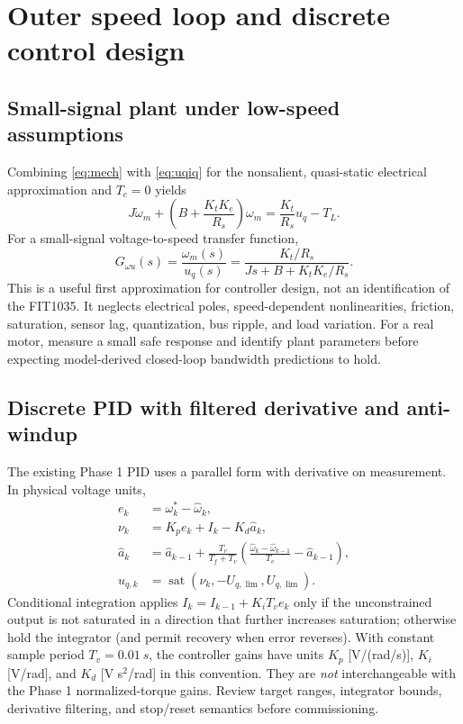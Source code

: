 \documentclass[10pt,letterpaper]{article}
\newcommand{\sat}{\operatorname{sat}}
\begin{document}
\section{Outer speed loop and discrete control design}
\subsection{Small-signal plant under low-speed assumptions}
Combining \eqref{eq:mech} with \eqref{eq:uqiq} for the nonsalient, quasi-static electrical approximation and $T_c=0$ yields
\begin{equation}
J\dot\omega_m+\left(B+\frac{K_tK_e}{R_s}\right)\omega_m
=\frac{K_t}{R_s}u_q-T_L.
\end{equation}
For a small-signal voltage-to-speed transfer function,
\begin{equation}\label{eq:planttf}
G_{\omega u}(s)=\frac{\omega_m(s)}{u_q(s)}
=\frac{K_t/R_s}{Js+B+K_tK_e/R_s}.
\end{equation}
This is a useful first approximation for controller design, not an identification of the FIT1035. It neglects electrical poles, speed-dependent nonlinearities, friction, saturation, sensor lag, quantization, bus ripple, and load variation. For a real motor, measure a small safe response and identify plant parameters before expecting model-derived closed-loop bandwidth predictions to hold.

\subsection{Discrete PID with filtered derivative and anti-windup}
The existing Phase 1 PID uses a parallel form with derivative on measurement. In physical voltage units,
\begin{align}
e_k&=\omega_k^*-\hat\omega_k,\\
\nu_k&=K_p e_k+I_k-K_d \hat a_k,\\
\hat a_k&=\hat a_{k-1}+\frac{T_v}{T_f+T_v}
\left(\frac{\hat\omega_k-\hat\omega_{k-1}}{T_v}-\hat a_{k-1}\right),\\
u_{q,k}&=\sat(\nu_k,-U_{q,\lim},U_{q,\lim}).
\end{align}
Conditional integration applies $I_k=I_{k-1}+K_iT_v e_k$ only if the unconstrained output is not saturated in a direction that further increases saturation; otherwise hold the integrator (and permit recovery when error reverses). With constant sample period $T_v=\SI{0.01}{s}$, the controller gains have units $K_p$ [V/(rad/s)], $K_i$ [V/rad], and $K_d$ [V s$^2$/rad] in this convention. They are \emph{not} interchangeable with the Phase 1 normalized-torque gains. Review target ranges, integrator bounds, derivative filtering, and stop/reset semantics before commissioning.
\end{document}
